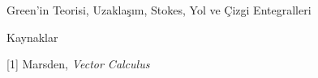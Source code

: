 \documentclass[12pt,fleqn]{article}\usepackage{../../common}
\begin{document}
Green'in Teorisi, Uzaklaşım, Stokes, Yol ve Çizgi Entegralleri





















Kaynaklar

[1] Marsden, {\em Vector Calculus}
\end{document}
